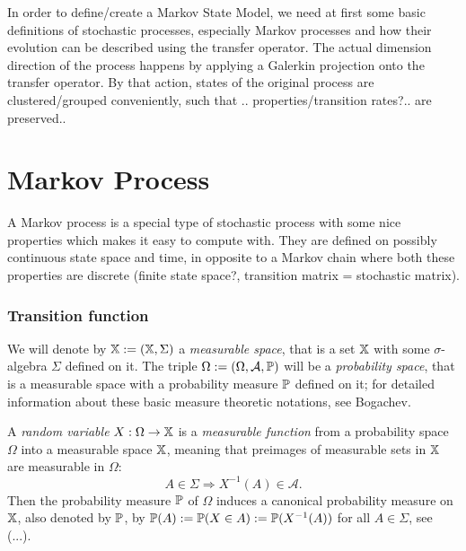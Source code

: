 
In order to define/create a Markov State Model, we need at first some basic definitions of stochastic processes, especially Markov processes and how their evolution can be described using the transfer operator. The actual dimension direction of the process happens by applying a Galerkin projection onto the transfer operator. By that action, states of the original process are clustered/grouped conveniently, such that .. properties/transition rates?.. are preserved..

\section{Markov Process}
\label{sec:markov}

A Markov process is a special type of stochastic process with some nice properties which makes it easy to compute with. They are defined on possibly continuous state space and time, in opposite to a Markov chain where both these properties are discrete (finite state space?, transition matrix = stochastic matrix).

\subsubsection*{Transition function}

We will denote by $\mathbb{X} := (\mathbb{X},\Sigma)$ a \textit{measurable space}, that is a set $\mathbb{X}$ with some $\sigma$-algebra $\Sigma$ defined on it. The triple $\Omega := (\Omega, \mathcal{A}, \mathbb{P})$ will be a \textit{probability space}, that is a 
measurable space with a probability measure $\mathbb{P}$ defined on it; for detailed information about these basic measure theoretic notations, see Bogachev\cite[chapter~1]{bogachev2007measure}.

A \textit{random variable} $X: \Omega \rightarrow \mathbb{X}$ is a \textit{measurable function} from a probability space $\Omega$ into a measurable space $\mathbb{X}$, meaning that preimages of measurable sets in $\mathbb{X}$ are measurable in $\Omega$:
\begin{equation*}
A \in \Sigma \Rightarrow X^{-1}(A) \in \mathcal{A}.
\end{equation*}
Then the probability measure $\mathbb{P}$ of $\Omega$ induces a canonical probability measure on $\mathbb{X}$, also
denoted by $\mathbb{P}$, by $\mathbb{P}(A) := \mathbb{P}(X \in A) := \mathbb{P}(X^{-1}(A))$ for all $A \in \Sigma$, see (...).

